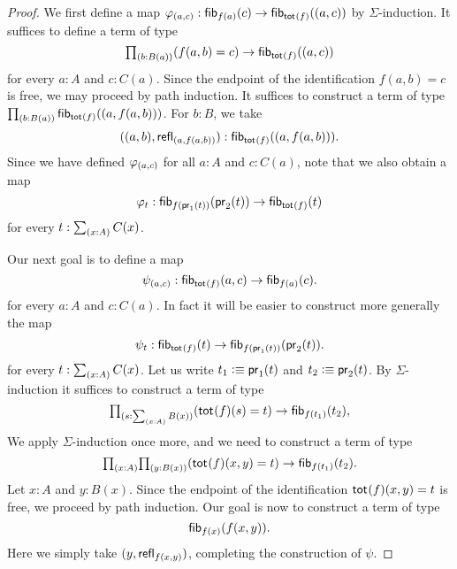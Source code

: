 \begin{proof}
We first define a map $\varphi_{{\mathopen{}(a,c)\mathclose{}}}:{\mathsf{fib}_{f(a)}(c)}\to \mathsf{fib}_{\mathsf{tot}_{}(f)}({\mathopen{}(a,c)\mathclose{}})$ by $\Sigma$-induction.
It suffices to define a term of type
\begin{equation*}
\prd{b:B(a)} (f(a,b)=c)\to \fib{\total{f}}{\pairr{a,c}}
\end{equation*}
for every $a:A$ and $c:C(a)$. 
Since the endpoint of the identification $f(a,b)=c$ is free, we may proceed by path induction. 
It suffices to construct a term of type $\prd{b:B(a)} \fib{\total{f}}{\pairr{a,f(a,b)}}$.
For $b:B$, we take
\begin{equation*}
{\mathopen{}({\mathopen{}(a,b)\mathclose{}},\mathsf{refl}_{{\mathopen{}(a,f(a,b))\mathclose{}}})\mathclose{}}:\mathsf{fib}_{\mathsf{tot}_{}(f)}({\mathopen{}(a,f(a,b))\mathclose{}}).
\end{equation*}
Since we have defined $\varphi_{{\mathopen{}(a,c)\mathclose{}}}$ for all $a:A$ and $c:C(a)$, note that we also obtain a map
\begin{equation*}
\varphi_t:{\mathsf{fib}_{f(\mathsf{pr}_{1}(t))}(\mathsf{pr}_{2}(t))}\to \mathsf{fib}_{\mathsf{tot}_{}(f)}(t)
\end{equation*}
for every $t:\sm{x:A}C(x)$.

Our next goal is to define a map
\begin{equation*}
\psi_{(a,c)}:{\mathsf{fib}_{\mathsf{tot}_{}(f)}(a,c)}\to{\mathsf{fib}_{f(a)}(c)}.
\end{equation*}
for every $a:A$ and $c:C(a)$. In fact it will be easier to construct more generally the map
\begin{equation*}
\psi_t : \mathsf{fib}_{\mathsf{tot}_{}(f)}(t)\to \mathsf{fib}_{f(\mathsf{pr}_{1}(t))}(\mathsf{pr}_{2}(t)).
\end{equation*}
for every $t:\sm{x:A}C(x)$. Let us write $t_1\vcentcolon\equiv \mathsf{pr}_{1}(t)$ and $t_2\vcentcolon\equiv \mathsf{pr}_{2}(t)$.
By $\Sigma$-induction it suffices to construct a term of type
\begin{equation*}
\prd{s:\sm{x:A}B(x)} (\total{f}(s)=t)\to \fib{f(t_1)}{t_2},
\end{equation*}
We apply $\Sigma$-induction once more, and we need to construct a term of type
\begin{equation*}
\prd{x:A}{y:B(x)} (\total{f}(x,y)=t)\to \fib{f(t_1)}{t_2}.
\end{equation*}
Let $x:A$ and $y:B(x)$. Since the endpoint of the identification $\mathsf{tot}_{}(f)(x,y)=t$ is free, we proceed by path induction. Our goal is now to construct a term of type
\begin{equation*}
\mathsf{fib}_{f(x)}(f(x,y)). 
\end{equation*}
Here we simply take ${\mathopen{}(y,\mathsf{refl}_{f(x,y)})\mathclose{}}$, completing the construction of $\psi$.


\end{proof}
